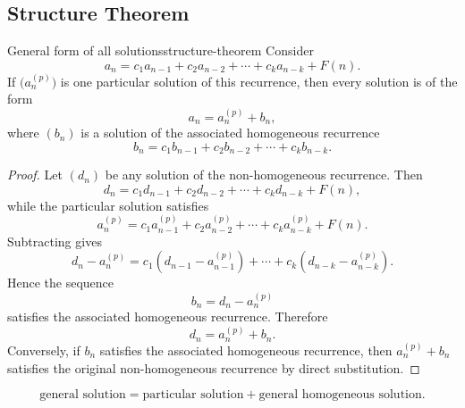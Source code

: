 \subsection{Structure Theorem}

\begin{theorem}{General form of all solutions}{structure-theorem}
Consider
\[
a_n=c_1a_{n-1}+c_2a_{n-2}+\cdots+c_ka_{n-k}+F(n).
\]
If \(\bigl(a_n^{(p)}\bigr)\) is one particular solution of this recurrence, then every solution is of the form
\[
a_n=a_n^{(p)}+b_n,
\]
where \((b_n)\) is a solution of the associated homogeneous recurrence
\[
b_n=c_1b_{n-1}+c_2b_{n-2}+\cdots+c_kb_{n-k}.
\]
\end{theorem}

\begin{proof}
Let \((d_n)\) be any solution of the non-homogeneous recurrence. Then
\[
d_n=c_1d_{n-1}+c_2d_{n-2}+\cdots+c_kd_{n-k}+F(n),
\]
while the particular solution satisfies
\[
a_n^{(p)}=c_1a_{n-1}^{(p)}+c_2a_{n-2}^{(p)}+\cdots+c_ka_{n-k}^{(p)}+F(n).
\]
Subtracting gives
\[
d_n-a_n^{(p)}
=
c_1(d_{n-1}-a_{n-1}^{(p)})
+\cdots+
c_k(d_{n-k}-a_{n-k}^{(p)}).
\]
Hence the sequence
\[
b_n=d_n-a_n^{(p)}
\]
satisfies the associated homogeneous recurrence. Therefore
\[
d_n=a_n^{(p)}+b_n.
\]
Conversely, if \(b_n\) satisfies the associated homogeneous recurrence, then \(a_n^{(p)}+b_n\) satisfies the original non-homogeneous recurrence by direct substitution.
\end{proof}

\begin{keyformula}[title={General solution of a linear non-homogeneous recurrence}]
\[
\boxed{
\text{general solution}
=
\text{particular solution}
+
\text{general homogeneous solution}.
}
\]
\end{keyformula}

\begin{center}
\end{center}

